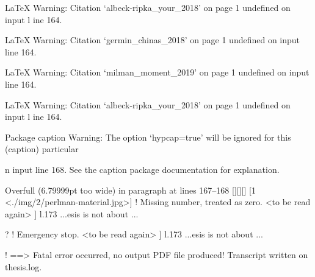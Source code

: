 LaTeX Warning: Citation `albeck-ripka_your_2018' on page 1 undefined on input l
ine 164.


LaTeX Warning: Citation `germin_chinas_2018' on page 1 undefined on input line 
164.


LaTeX Warning: Citation `milman_moment_2019' on page 1 undefined on input line 
164.


LaTeX Warning: Citation `albeck-ripka_your_2018' on page 1 undefined on input l
ine 164.


Package caption Warning: The option `hypcap=true' will be ignored for this
(caption)                particular \caption on input line 168.
See the caption package documentation for explanation.


Overfull \hbox (6.79999pt too wide) in paragraph at lines 167--168
[][][] 
[1 <./img/2/perlman-material.jpg>]
! Missing number, treated as zero.
<to be read again> 
                   ]
l.173 ...esis is not about \DIFdelbegin {}
                                                  \DIFdelend \DIFaddbegin \D...

? 
! Emergency stop.
<to be read again> 
                   ]
l.173 ...esis is not about \DIFdelbegin {}
                                                  \DIFdelend \DIFaddbegin \D...

!  ==> Fatal error occurred, no output PDF file produced!
Transcript written on thesis.log.

